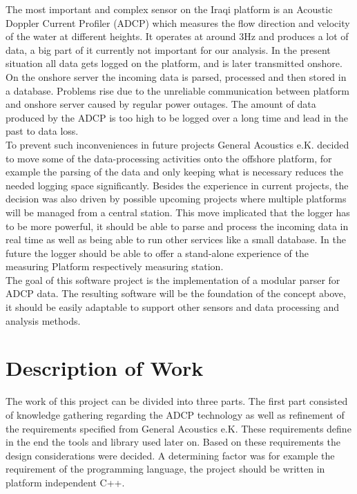 The most important and complex sensor on the Iraqi platform is an Acoustic Doppler Current Profiler (ADCP) which measures the flow direction and velocity of the water at different heights. It operates at around 3Hz and produces a lot of data, a big part of it currently not important for our analysis. In the present situation all data gets logged on the platform, and is later transmitted onshore. On the onshore server the incoming data is parsed, processed and then stored in a database. Problems rise due to the unreliable communication between platform and onshore server caused by regular power outages. The amount of data produced by the ADCP is too high to be logged over a long time and lead in the past to data loss.\\\newline
To prevent such inconveniences in future projects General Acoustics e.K. decided to move some of the data-processing activities onto the offshore platform, for example the parsing of the data and only keeping what is necessary reduces the needed logging space significantly. Besides the experience in current projects, the decision was also driven by possible upcoming projects where multiple platforms will be managed from a central station. This move implicated that the logger has to be more powerful, it should be able to parse and process the incoming data in real time as well as being able to run other services like a small database. In the future the logger should be able to offer a stand-alone experience of the measuring Platform respectively measuring station.\\\newline
The goal of this software project is the implementation of a modular parser for ADCP data. The resulting software will be the foundation of the concept above, it should be easily adaptable to support other sensors and data processing and analysis methods. 

\section{Description of Work}
The work of this project can be divided into three parts. The first part consisted of knowledge gathering regarding the ADCP technology as well as refinement of the requirements specified from General Acoustics e.K. These requirements define in the end the tools and library used later on. Based on these requirements the design considerations were decided. A determining factor was for example the requirement of the programming language, the project should be written in platform independent C++. %

